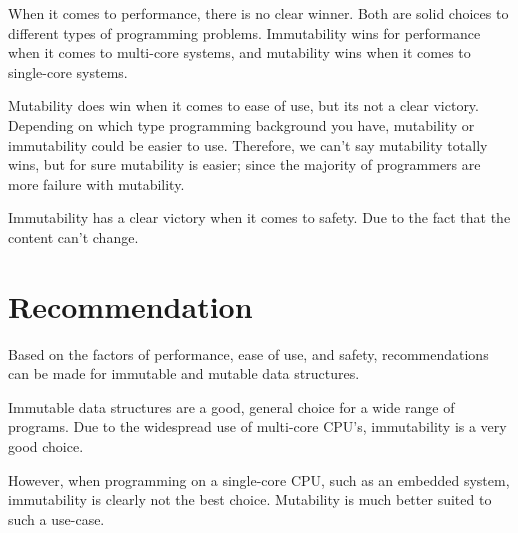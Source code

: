\documentclass[11pt]{article}
\begin{document}
When it comes to performance, there is no clear winner. Both are solid choices
to different types of programming problems. Immutability wins for performance
when it comes to multi-core systems, and mutability wins when it comes to
single-core systems.

Mutability does win when it comes to ease of use, but its not a clear victory.
Depending on which type programming background you have, mutability or
immutability could be easier to use. Therefore, we can't say mutability totally
wins, but for sure mutability is easier; since the majority of programmers
are more failure with mutability.

Immutability has a clear victory when it comes to safety. Due to the fact that
the content can't change.

\section*{Recommendation}
Based on the factors of performance, ease of use, and safety, recommendations
can be made for immutable and mutable data structures.

Immutable data structures are a good, general choice for a wide range of
programs. Due to the widespread use of multi-core CPU's, immutability is a
very good choice.

However, when programming on a single-core CPU, such as an embedded system,
immutability is clearly not the best choice. Mutability is much better suited to
such a use-case.

\clearpage
\end{document}

